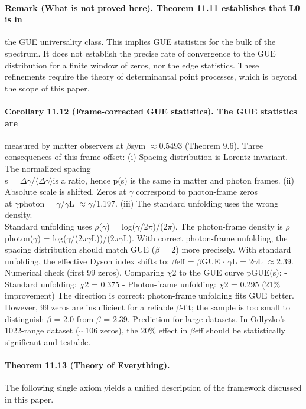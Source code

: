 \documentclass[12pt,a4paper]{article}
\begin{document}
\paragraph*{Remark (What is not proved here). Theorem 11.11 establishes that L0 is in}
the GUE universality class. This implies GUE statistics for the bulk of the spectrum. It does not establish the precise rate of convergence to the GUE distribution for a finite window of zeros, nor the edge statistics. These refinements require the theory of determinantal point processes, which is beyond the scope of this paper.
\paragraph*{Corollary 11.12 (Frame-corrected GUE statistics). The GUE statistics are}
measured by matter observers at $\beta$sym $\approx$0.5493 (Theorem 9.6). Three consequences of this frame offset:
(i) Spacing distribution is Lorentz-invariant. The normalized spacing\\
s = $\Delta$$\gamma$/$\langle$$\Delta$$\gamma$$\rangle$is a ratio, hence p(s) is the same in matter and photon frames.
(ii) Absolute scale is shifted. Zeros at $\gamma$ correspond to photon-frame zeros\\
at $\gamma$photon = $\gamma$/$\gamma$L $\approx$$\gamma$/1.197.
(iii) The standard unfolding uses the wrong density.\\
Standard unfolding uses $\rho$($\gamma$) = log($\gamma$/2$\pi$)/(2$\pi$). The photon-frame density is $\rho$photon($\gamma$) = log($\gamma$/(2$\pi$$\gamma$L))/(2$\pi$$\gamma$L). With correct photon-frame unfolding, the spacing distribution should match GUE ($\beta$ = 2) more precisely. With standard unfolding, the effective Dyson index shifts to: $\beta$eff = $\beta$GUE $\cdot$ $\gamma$L = 2$\gamma$L $\approx$2.39. Numerical check (first 99 zeros). Comparing $\chi$2 to the GUE curve pGUE(s):
- Standard unfolding: $\chi$2 = 0.375
- Photon-frame unfolding: $\chi$2 = 0.295
(21\% improvement) The direction is correct: photon-frame unfolding fits GUE better. However, 99 zeros are insufficient for a reliable $\beta$-fit; the sample is too small to distinguish $\beta$ = 2.0 from $\beta$ = 2.39. Prediction for large datasets. In Odlyzko's 1022-range dataset ($\sim$106 zeros), the 20\% effect in $\beta$eff should be statistically significant and testable.
\paragraph*{Theorem 11.13 (Theory of Everything).}
The following single axiom yields a unified description of the framework discussed in this paper.
\end{document}
